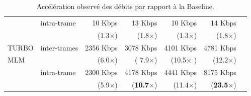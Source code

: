 \documentclass[../main.tex]{subfiles}
\begin{document}
\begin{table}[!tb]
\begin{tabular}{llrrrrr}
                & intra-trame   & 10  Kbps      & 13 Kbps       & 10 Kbps       & 14 Kbps       \\
                &               & (1.3$\times$)   & (1.8$\times$)   & (1.3$\times$)   & (1.8$\times$)    \\
        \cmidrule(l){1-6} 
        TURBO   & inter-trames  & 2356 Kbps     &3078 Kbps      & 4101 Kbps     & 4781 Kbps     \\
        MLM     &               & (6.0$\times$)   &( 7.9$\times$)   & (10.5$\times$ ) & (12.2$\times$)   \\
                & intra-trame   & 2300 Kbps     & 4178 Kbps     & 4441 Kbps     & 8175 Kbps     \\
                &               & (5.9$\times$)   & (\textcolor{black}{\textbf{10.7}}$\times$)  & (11.4$\times$)  & (\textcolor{black}{\textbf{23.5$\times$}})   \\
        \bottomrule
    \end{tabular}
    \caption{Accélération observé des débits par rapport à la Baseline.}
    \label{tab:sum}
\end{table}
\end{document}
